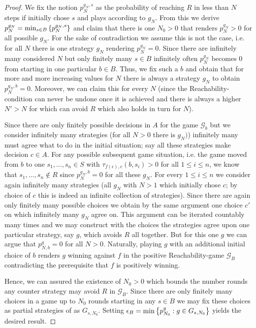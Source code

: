 \begin{proof}
  We fix the notion $p_{N}^{g_{N}, s}$ as the probability of reaching $R$ in 
  less than $N$ steps if \adam{} initially chose $s$ and plays according to 
  $g_{N}$. From this we derive $p_{N}^{g_{N}} = 
  \min_{s\in B}\left\{p_{N}^{g_{N}, s}\right\}$ and claim that there is one 
  $N_{0} > 0$ that renders $p_{N}^{g_{N}} > 0$ for all possible $g_{N}$. For 
  the sake of contradiction we assume this is not the case, i.e. for all $N$ 
  there is one strategy $g_{N}$ rendering $p_{N}^{g_{N}} = 0$. Since there 
  are infinitely many considered $N$ but only finitely many $s\in B$ 
  infinitely often $p_{N}^{g_{N}}$ becomes $0$ from starting in one 
  particular $b\in B$. Thus, we fix such a $b$ and obtain that for more and 
  more increasing values for $N$ there is always a strategy $g_{N}$ to obtain 
  $p_{N}^{g_{N}, b} = 0$. Moreover, we can claim this for every $N$ (since 
  the Reachability-condition can never be undone once it is achieved and 
  there is always a higher $N' > N$ for which \adam{} can avoid $R$ which 
  also holds in turn for $N$).

  Since there are only finitely possible decisions in $A$ for the game 
  $\mathcal{G}_{b}$ but we consider infinitely many strategies (for all $N>0$ 
  there is $g_{N})$) infinitely many must agree what to do in the initial 
  situation; say all these strategies make decision $c\in A$. For any 
  possible subsequent game situation, i.e. the game moved from $b$ to 
  one $s_{1},\dots, s_{n}\in S$ with $\tau_{f(\epsilon), c}(b, s_{i}) > 0$ 
  for all $1\leq i\leq n$, we know that $s_{1},\dots, s_{n}\not\in R$ since
  $p_{N}^{g_{N}, b} = 0$ for all these $g_{N}$. For every $1\leq i\leq n$ we 
  consider again infinitely many strategies (all $g_{N}$ with $N>1$ which 
  initially chose $c$; by choice of $c$ this is indeed an infinite collection
  of strategies). Since there are again only finitely many possible choices 
  we obtain by the same argument one choice $c'$ on which infinitely many 
  $g_{N}$ agree on. This argument can be iterated countably many times and we 
  may construct with the choices the strategies agree upon one particular 
  strategy, say $g$, which avoids $R$ all together. But for this one $g$ we
  can argue that $p_{N, b}^{g} = 0$ for all $N>0$. Naturally, playing $g$ 
  with an additional initial choice of $b$ renders $g$ winning against $f$ in
  the positive Reachability-game $\mathcal{G}_{B}$ contradicting the 
  prerequisite that $f$ is positively winning.

  Hence, we can assured the existence of $N_{0} > 0$ which bounds the number
  rounds any counter strategy may avoid $R$ in $\mathcal{G}_{B}$. Since there
  are only finitely many choices in a game up to $N_{0}$ rounds starting in
  any $s\in B$ we may fix these choices as partial strategies of \adam{} as
  $G_{s,N_{0}}$. Setting 
  $\epsilon_{B} = \min\left\{p^{g}_{N_{0}}:g\in G_{s, N_{0}}\right\}$ yields the desired 
  result.
\end{proof}

